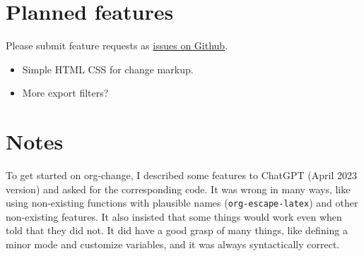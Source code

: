 \documentclass[11pt]{article}
\begin{document}
\section{Planned features}
\label{sec:org3f02b67}

Please submit feature requests as \href{https://github.com/drghirlanda/org-change/issues}{issues on Github}.

\begin{itemize}
\item Simple HTML CSS for change markup.
\item More export filters?
\end{itemize}

\section{Notes}
\label{sec:orgc26538c}

To get started on org-change, I described some features to ChatGPT
(April 2023 version) and asked for the corresponding code. It was
wrong in many ways, like using non-existing functions with plausible
names (\texttt{org-escape-latex}) and other non-existing features. It also
insisted that some things would work even when told that they did
not. It did have a good grasp of many things, like defining a minor
mode and customize variables, and it was always syntactically correct.
\end{document}
